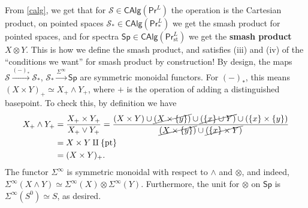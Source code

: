 From \cref{calg}, we get that for $\mathcal{S} \in  \mathsf{CAlg} (\mathsf{Pr} ^L)$ the operation is the Cartesian product, on pointed spaces $\mathcal{S} _* \in \mathsf{CAlg} (\mathsf{Pr} _*^L)$ we get the smash product for pointed spaces, and for spectra $\mathsf{Sp} \in \mathsf{CAlg} (\mathsf{Pr} ^L_{\mathrm{st}})$ we get the \textbf{smash product} $X\otimes Y$. This is how we define the smash product, and satisfies (iii) and (iv) of the ``conditions we want'' for smash product by construction! By design, the maps $\mathcal{S} \overset{(-)_*}{\longrightarrow}\mathcal{S} _* $, $\mathcal{S} _* \overset{\Sigma^{\infty} }{\longrightarrow} \mathsf{Sp} $ are symmetric monoidal functors. For $(-)_*$, this means $(X \times Y)_+ \simeq  X_+ \wedge Y_+$, where $+$ is the operation of adding a distinguished basepoint. To check this, by definition we have 
\begin{align*}
    X_+ \wedge Y_+ &= \frac{X_+ \times Y_+ }{X_+ \vee Y_+}= \frac{(X\times Y) \cup \cancel{ (X \times \{y\})} \cup  \cancel{ (\{x \} \cup Y)} \cup (\{x\} \times \{y\} )}{\cancel{ (X \times \{y\} )} \cup \cancel{ (\{x\} \times Y)}}\\
                   &=X \times Y \amalg \{\text{pt}  \}\\
                   &=(X \times Y)_+.
\end{align*}The functor $\Sigma^{\infty}$ is symmetric monoidal with respect to $\wedge $ and $\otimes  $, and indeed, $\Sigma ^{\infty}(X \wedge Y) \simeq \Sigma^{\infty}(X) \otimes \Sigma^{\infty}(Y)$. Furthermore, the unit for $\otimes$ on $\mathsf{Sp} $ is $\Sigma^{\infty}(S^0) \simeq S$, as desired.

